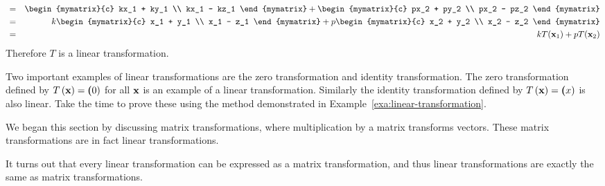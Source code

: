 \begin{solution}
\begin{eqnarray*}
                                        &=& \begin{mymatrix}{c} kx_1 + ky_1 \\ kx_1 - kz_1 \end{mymatrix} + \begin{mymatrix}{c} px_2 + py_2 \\  px_2 - pz_2 \end{mymatrix} \\
                                        &=& k \begin{mymatrix}{c} x_1 + y_1 \\ x_1 - z_1 \end{mymatrix} + p \begin{mymatrix}{c} x_2 + y_2 \\  x_2 - z_2 \end{mymatrix} \\
                                        &=& k T(\vect{x}_1) + p T(\vect{x}_2) 
  \end{eqnarray*}
  Therefore $T$ is a linear transformation. 
\end{solution}

Two important examples of linear transformations are the zero transformation and identity transformation. The zero transformation defined by $T\left(\mbox{\bf x} \right) = \mbox{\bf (}0)$ for all $\mbox{\bf x}$ is an example of a linear transformation. Similarly the identity transformation defined by $T\left(\mbox{\bf x} \right) = \mbox{\bf (}x)$ is also linear. Take the time to prove these using the method demonstrated in Example~\ref{exa:linear-transformation}.

We began this section by discussing matrix transformations, where multiplication by a matrix transforms vectors. These matrix transformations are in fact linear transformations. 

It turns out that every linear transformation can be expressed as a matrix transformation, and thus linear transformations are exactly the same as matrix transformations. 
